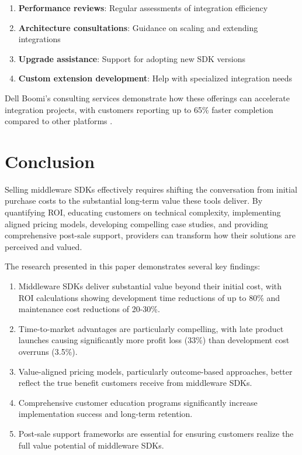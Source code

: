 \documentclass[11pt,a4paper]{article}
\begin{document}
\begin{enumerate}
    \item \textbf{Performance reviews}: Regular assessments of integration efficiency
    \item \textbf{Architecture consultations}: Guidance on scaling and extending integrations
    \item \textbf{Upgrade assistance}: Support for adopting new SDK versions
    \item \textbf{Custom extension development}: Help with specialized integration needs
\end{enumerate}

Dell Boomi's consulting services demonstrate how these offerings can accelerate integration projects, with customers reporting up to 65\% faster completion compared to other platforms \cite{multishoring2023}.

\section{Conclusion}

Selling middleware SDKs effectively requires shifting the conversation from initial purchase costs to the substantial long-term value these tools deliver. By quantifying ROI, educating customers on technical complexity, implementing aligned pricing models, developing compelling case studies, and providing comprehensive post-sale support, providers can transform how their solutions are perceived and valued.

The research presented in this paper demonstrates several key findings:

\begin{enumerate}
    \item Middleware SDKs deliver substantial value beyond their initial cost, with ROI calculations showing development time reductions of up to 80\% and maintenance cost reductions of 20-30\%.
    \item Time-to-market advantages are particularly compelling, with late product launches causing significantly more profit loss (33\%) than development cost overruns (3.5\%).
    \item Value-aligned pricing models, particularly outcome-based approaches, better reflect the true benefit customers receive from middleware SDKs.
    \item Comprehensive customer education programs significantly increase implementation success and long-term retention.
    \item Post-sale support frameworks are essential for ensuring customers realize the full value potential of middleware SDKs.
\end{enumerate}
\end{document}
